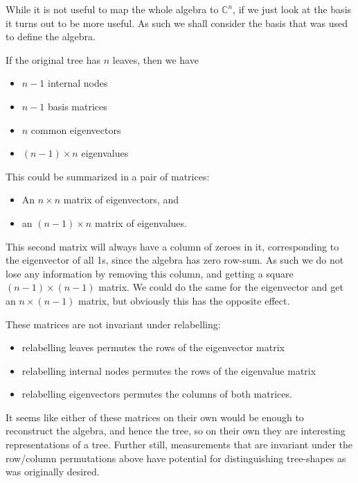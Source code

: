 \documentclass{report}
\begin{document}
While it is not useful to map the whole algebra to $\mathds{C}^n$, if we just
look at the basis it turns out to be more useful.
As such we shall consider the basis that was used to define the algebra.

If the original tree has $n$ leaves, then we have
\begin{itemize}
	\item $n-1$ internal nodes
	\item $n-1$ basis matrices
	\item $n$ common eigenvectors
	\item $(n-1) \times n$ eigenvalues
\end{itemize}

This could be summarized in a pair of matrices:
\begin{itemize}
	\item An $n \times n$ matrix of eigenvectors, and
	\item an $(n-1) \times n$ matrix of eigenvalues.
\end{itemize}

This second matrix will always have a column of zeroes in it, corresponding to
the eigenvector of all 1s, since the algebra has zero row-sum.
As such we do not lose any information by removing this column, and getting a
square $(n-1) \times (n-1)$ matrix.
We could do the same for the eigenvector and get an $n \times (n-1)$ matrix,
but obviously this has the opposite effect.

These matrices are not invariant under relabelling:
\begin{itemize}
	\item relabelling leaves permutes the rows of the eigenvector matrix
	\item relabelling internal nodes permutes the rows of the eigenvalue matrix
	\item relabelling eigenvectors permutes the columns of both matrices.
\end{itemize}

It seems like either of these matrices on their own would be enough to
reconstruct the algebra, and hence the tree, so on their own they are
interesting representations of a tree.
Further still, measurements that are invariant under the row/column
permutations above have potential for distinguishing tree-shapes as was
originally desired.
\end{document}
